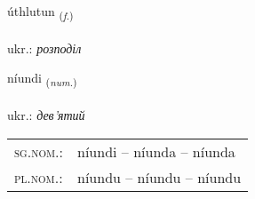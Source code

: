 \documentclass[frontgrid, backgrid]{flacards}\usepackage[]{graphicx}\usepackage[]{xcolor}
\begin{document}
\renewcommand{\flhead}{\vskip5pt \fboxsep=0pt {\small\bfseries\footnotesize Nafnorð | іменник}}
\renewcommand{\fcfoot}{\vskip5pt \fboxsep=0pt \hspace{2pt}{\small\bfseries\footnotesize 3K}}

\renewcommand{\blhead}{\vskip5pt {\small\bfseries\footnotesize Nafnorð | іменник }}
\renewcommand{\bcfoot}{\vskip5pt \hspace{2pt}{\small\bfseries\footnotesize 3K}}


{úthlutun \small{\textsubscript{(\textit{f.})}} \\[1ex] %
 \\
ukr.: \emph{розподіл} \\  [2ex]
\renewcommand*{\arraystretch}{0.8}
}

\renewcommand{\flhead}{\vskip5pt \fboxsep=0pt {\small\bfseries\footnotesize Töluorð | чисельник}}
\renewcommand{\fcfoot}{\vskip5pt \fboxsep=0pt \hspace{2pt}{\small\bfseries\footnotesize 3K}}

\renewcommand{\blhead}{\vskip5pt {\small\bfseries\footnotesize Töluorð | чисельник }}
\renewcommand{\bcfoot}{\vskip5pt \hspace{2pt}{\small\bfseries\footnotesize 3K}}


{níundi \small{\textsubscript{(\textit{num.})}} \\[1ex] %
\textphonetic{[nijʏntɪ]} \\
ukr.: \emph{дев'ятий} \\  [2ex]
\renewcommand*{\arraystretch}{0.8}
\begin{tabular}{ll}
\textsc{sg.nom.}: & níundi  --  níunda -- níunda \\ 
\textsc{pl.nom.}: & níundu -- níundu -- níundu
\end{tabular}
}
\end{document}
